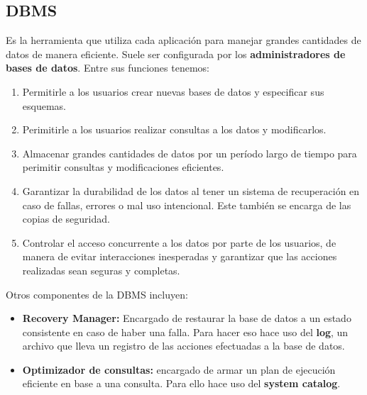 \subsection*{DBMS}
Es la herramienta que utiliza cada aplicación para manejar grandes cantidades de datos de manera eficiente. Suele ser configurada por los \textbf{administradores de bases de datos}.
Entre sus funciones tenemos:
\begin{enumerate}
    \item Permitirle a los usuarios crear nuevas bases de datos y especificar sus esquemas.
    \item Perimitirle a los usuarios realizar consultas a los datos y modificarlos.
    \item Almacenar grandes cantidades de datos por un período largo de tiempo para perimitir consultas y modificaciones eficientes.
    \item Garantizar la durabilidad de los datos al tener un sistema de recuperación en caso de fallas, errores o mal uso intencional. Este también se encarga de las copias de seguridad.
    \item Controlar el acceso concurrente a los datos por parte de los usuarios, de manera de evitar interacciones inesperadas y garantizar que las acciones realizadas sean seguras y completas.
\end{enumerate}
Otros componentes de la DBMS incluyen:
\begin{itemize}
    \item \textbf{Recovery Manager:} Encargado de restaurar la base de datos a un estado consistente en caso de haber una falla. Para hacer eso hace uso del \textbf{log}, un archivo que lleva un registro de las acciones efectuadas a la base de datos.
    \item \textbf{Optimizador de consultas:} encargado de armar un plan de ejecución eficiente en base a una consulta. Para ello hace uso del \textbf{system catalog}.
\end{itemize}

